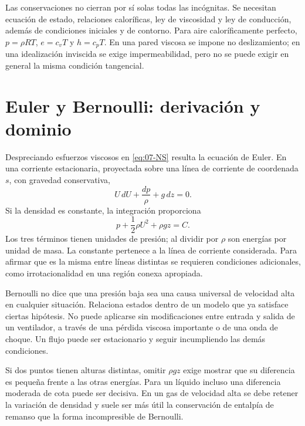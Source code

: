 Las conservaciones no cierran por sí solas todas las incógnitas. Se necesitan ecuación de estado, relaciones caloríficas, ley de viscosidad y ley de conducción, además de condiciones iniciales y de contorno. Para aire caloríficamente perfecto, $p=\rho RT$, $e=c_vT$ y $h=c_pT$. En una pared viscosa se impone no deslizamiento; en una idealización inviscida se exige impermeabilidad, pero no se puede exigir en general la misma condición tangencial.

\section{Euler y Bernoulli: derivación y dominio}
Despreciando esfuerzos viscosos en \eqref{eq:07-NS} resulta la ecuación de Euler. En una corriente estacionaria, proyectada sobre una línea de corriente de coordenada $s$, con gravedad conservativa,
\begin{equation}
 U\,dU+\frac{dp}{\rho}+g\,dz=0.
\end{equation}
Si la densidad es constante, la integración proporciona
\begin{equation}\label{eq:07-bern}
 p+\frac12\rho U^2+\rho gz=C.
\end{equation}
Los tres términos tienen unidades de presión; al dividir por $\rho$ son energías por unidad de masa. La constante pertenece a la línea de corriente considerada. Para afirmar que es la misma entre líneas distintas se requieren condiciones adicionales, como irrotacionalidad en una región conexa apropiada.

Bernoulli no dice que una presión baja sea una causa universal de velocidad alta en cualquier situación. Relaciona estados dentro de un modelo que ya satisface ciertas hipótesis. No puede aplicarse sin modificaciones entre entrada y salida de un ventilador, a través de una pérdida viscosa importante o de una onda de choque. Un flujo puede ser estacionario y seguir incumpliendo las demás condiciones.

Si dos puntos tienen alturas distintas, omitir $\rho gz$ exige mostrar que su diferencia es pequeña frente a las otras energías. Para un líquido incluso una diferencia moderada de cota puede ser decisiva. En un gas de velocidad alta se debe retener la variación de densidad y suele ser más útil la conservación de entalpía de remanso que la forma incompresible de Bernoulli.


